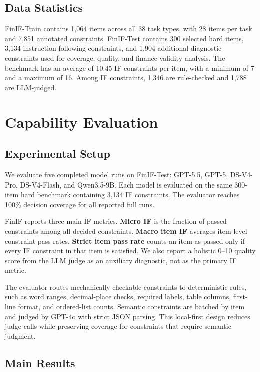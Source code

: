 \documentclass[11pt]{article}
\begin{document}
\subsection{Data Statistics}

FinIF-Train contains 1,064 items across all 38 task types, with 28 items per task and 7,851 annotated constraints. FinIF-Test contains 300 selected hard items, 3,134 instruction-following constraints, and 1,904 additional diagnostic constraints used for coverage, quality, and finance-validity analysis. The benchmark has an average of 10.45 IF constraints per item, with a minimum of 7 and a maximum of 16. Among IF constraints, 1,346 are rule-checked and 1,788 are LLM-judged.

\section{Capability Evaluation}

\subsection{Experimental Setup}

We evaluate five completed model runs on FinIF-Test: GPT-5.5, GPT-5, DS-V4-Pro, DS-V4-Flash, and Qwen3.5-9B. Each model is evaluated on the same 300-item hard benchmark containing 3,134 IF constraints. The evaluator reaches 100\% decision coverage for all reported full runs.

FinIF reports three main IF metrics. \textbf{Micro IF} is the fraction of passed constraints among all decided constraints. \textbf{Macro item IF} averages item-level constraint pass rates. \textbf{Strict item pass rate} counts an item as passed only if every IF constraint in that item is satisfied. We also report a holistic 0--10 quality score from the LLM judge as an auxiliary diagnostic, not as the primary IF metric.

The evaluator routes mechanically checkable constraints to deterministic rules, such as word ranges, decimal-place checks, required labels, table columns, first-line format, and ordered-list counts. Semantic constraints are batched by item and judged by GPT-4o with strict JSON parsing. This local-first design reduces judge calls while preserving coverage for constraints that require semantic judgment.

\subsection{Main Results}
\end{document}
